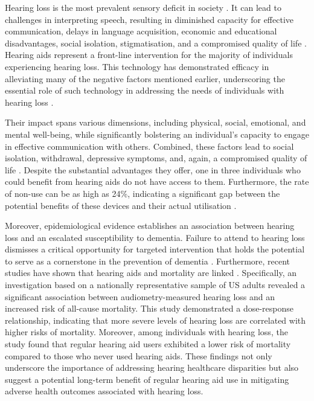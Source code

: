 \documentclass{l4proj}
\begin{document}
Hearing loss is the most prevalent sensory deficit in society \citep{sheffield2019epidemiology}. It can lead to challenges in interpreting speech, resulting in diminished capacity for effective communication, delays in language acquisition, economic and educational disadvantages, social isolation, stigmatisation, and a compromised quality of life \citep{mathers2000global, lawrence2020hearing, benefit_costs}. Hearing aids represent a front-line intervention for the majority of individuals experiencing hearing loss. This technology has demonstrated efficacy in alleviating many of the negative factors mentioned earlier, underscoring the essential role of such technology in addressing the needs of individuals with hearing loss \citep{borre2023impact, ijerph18147259}. 

Their impact spans various dimensions, including physical, social, emotional, and mental well-being, while significantly bolstering an individual's capacity to engage in effective communication with others. Combined, these factors lead to social isolation, withdrawal, depressive symptoms, and, again, a compromised quality of life \citep{benefit_costs}. Despite the substantial advantages they offer, one in three individuals who could benefit from hearing aids do not have access to them. Furthermore, the rate of non-use can be as high as 24\%, indicating a significant gap between the potential benefits of these devices and their actual utilisation \citep{ferguson2017hearing}.

Moreover, epidemiological evidence establishes an association between hearing loss and an escalated susceptibility to dementia. Failure to attend to hearing loss dismisses a critical opportunity for targeted intervention that holds the potential to serve as a cornerstone in the prevention of dementia \citep{dementia, 10.1001/archneurol.2010.362, livingston2020dementia, loughrey2018association}. Furthermore, recent studies have shown that hearing aids and mortality are linked \citep{choi2024association}. Specifically, an investigation based on a nationally representative sample of US adults revealed a significant association between audiometry-measured hearing loss and an increased risk of all-cause mortality. This study demonstrated a dose-response relationship, indicating that more severe levels of hearing loss are correlated with higher risks of mortality. Moreover, among individuals with hearing loss, the study found that regular hearing aid users exhibited a lower risk of mortality compared to those who never used hearing aids. These findings not only underscore the importance of addressing hearing healthcare disparities but also suggest a potential long-term benefit of regular hearing aid use in mitigating adverse health outcomes associated with hearing loss.
\end{document}
